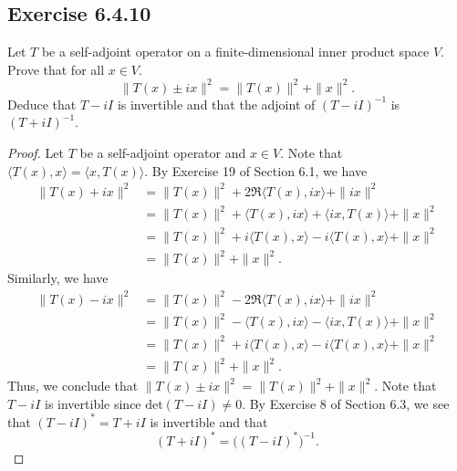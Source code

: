 \subsection*{Exercise 6.4.10}\label{Exercise 6.4.10} Let \( T  \) be a self-adjoint operator on a finite-dimensional inner product space \( V  \). Prove that for all \( x \in V  \).
\[ \|T(x) \pm ix\|^{2} = \|T(x)\|^{2} + \|x\|^{2}.  \]
Deduce that \( T - i I  \) is invertible and that the adjoint of \( (T - iI )^{-1} \) is \( (T + i I )^{-1} \).
\begin{proof}
Let \( T  \) be a self-adjoint operator and \( x \in V  \). Note that \( \langle T(x)  , x  \rangle = \langle x , T(x) \rangle \). By Exercise 19 of Section 6.1, we have
\begin{align*}
    \|T(x) + ix \|^{2} &= \|T(x)\|^{2} + 2 \Re \langle T(x) , ix  \rangle + \|ix \|^{2} \\
                       &= \|T(x)\|^{2} + \langle T(x)  , ix  \rangle + \langle ix  , T(x)  \rangle + \|x\|^{2}  \\
                       &= \|T(x)\|^{2} +  i \langle T(x)   , x \rangle - i \langle T(x)  , x  \rangle + \|x\|^{2} \\  
                       &= \|T(x)\|^{2} + \|x\|^{2}.
\end{align*}
Similarly, we have
\begin{align*}
    \|T(x) - ix \|^{2} &= \|T(x)\|^{2} - 2 \Re \langle T(x) , ix  \rangle + \|ix\|^{2} \\
                       &= \|T(x)\|^{2} - \langle T(x)  , ix  \rangle - \langle ix , T(x) \rangle + \|x\|^{2} \\
                       &= \|T(x)\|^{2} + i \langle T(x)  , x  \rangle - i \langle T(x)  , x  \rangle + \|x\|^{2} \\
                       &= \|T(x)\|^{2} + \|x\|^{2}.
\end{align*}
Thus, we conclude that \( \|T(x) \pm ix\|^{2} = \|T(x)\|^{2} + \|x\|^{2} \). Note that \( T - iI  \) is invertible since \( \text{det}(T - iI) \neq 0  \). By Exercise 8 of Section 6.3, we see that \( (T - iI)^{*} = T + iI \) is invertible and that 
\[ (T + iI)^{*} = \Big( (T - iI)^{*} \Big)^{-1}.  \]
\end{proof}

